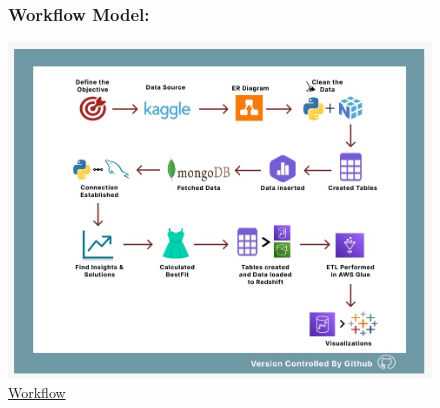 \documentclass[11pt,journal,compsoc]{IEEEtran}
\begin{document}
\begin{figure}
    \subsubsection{Workflow Model:} 
    \includegraphics[scale=0.23]{images/workflow_hs.jpeg}
    \caption{\href{https://www.kaggle.com/datasets/odins0n/hm256x256}{ Workflow}}
\end{figure}
\end{document}
